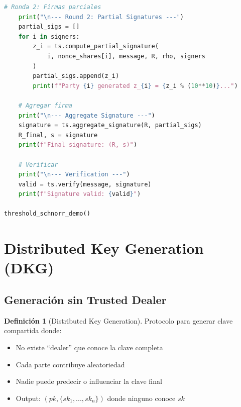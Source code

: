 \documentclass[11pt,a4paper,twoside]{book}
\theoremstyle{definition}
\newtheorem{definition}{Definición}[chapter]
\theoremstyle{remark}
\begin{document}
\begin{lstlisting}[language=Python, caption={Implementación de Threshold Schnorr (FROST simplificado)}]
    # Ronda 2: Firmas parciales
    print("\n--- Round 2: Partial Signatures ---")
    partial_sigs = []
    for i in signers:
        z_i = ts.compute_partial_signature(
            i, nonce_shares[i], message, R, rho, signers
        )
        partial_sigs.append(z_i)
        print(f"Party {i} generated z_{i} = {z_i % (10**10)}...")
    
    # Agregar firma
    print("\n--- Aggregate Signature ---")
    signature = ts.aggregate_signature(R, partial_sigs)
    R_final, s = signature
    print(f"Final signature: (R, s)")
    
    # Verificar
    print("\n--- Verification ---")
    valid = ts.verify(message, signature)
    print(f"Signature valid: {valid}")

threshold_schnorr_demo()
\end{lstlisting}

\section{Distributed Key Generation (DKG)}
\label{sec:dkg}

\subsection{Generación sin Trusted Dealer}

\begin{definition}[Distributed Key Generation]
Protocolo para generar clave compartida donde:
\begin{itemize}
    \item No existe ``dealer'' que conoce la clave completa
    \item Cada parte contribuye aleatoriedad
    \item Nadie puede predecir o influenciar la clave final
    \item Output: $(pk, \{sk_1, ..., sk_n\})$ donde ninguno conoce $sk$
\end{itemize}
\end{definition}
\end{document}
